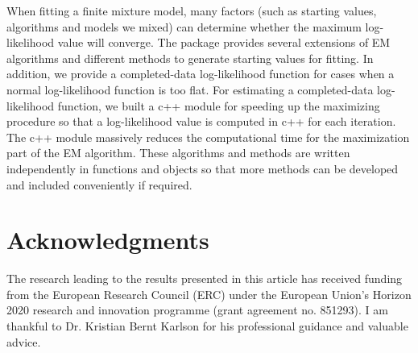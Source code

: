 \documentclass[nojss]{jss}
\begin{document}
   When fitting a finite mixture model, many factors (such as starting values, algorithms and models we mixed) can determine whether the maximum log-likelihood value will converge. The  package provides several extensions of EM algorithms and different methods to generate starting values for fitting. In addition, we provide a completed-data log-likelihood function for cases when a normal log-likelihood function is too flat. For estimating a completed-data log-likelihood function, we built a c++ module for speeding up the maximizing procedure so that a log-likelihood value is computed in c++ for each iteration. The c++ module massively reduces the computational time for the maximization part of the EM algorithm. These algorithms and methods are written independently in functions and objects so that more methods can be developed and included conveniently if required. 
   
   \section*{Acknowledgments}
   The research leading to the results presented in this article has received funding from the European Research Council (ERC) under the European Union’s Horizon 2020 research and innovation programme (grant agreement no. 851293). I am thankful to Dr. Kristian Bernt Karlson for his professional guidance and valuable advice. 
   
\end{document}
